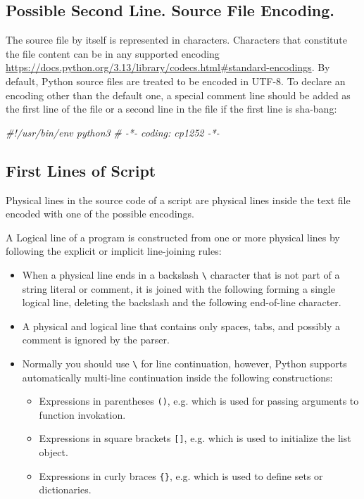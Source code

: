 \documentclass[
]{article}
\newenvironment{Shaded}{}{}
\newcommand{\CommentTok}[1]{\textcolor[rgb]{0.38,0.63,0.69}{\textit{#1}}}
\begin{document}
\hypertarget{possible-second-line-source-file-encoding}{%
\subsection{Possible Second Line. Source File
Encoding.}\label{possible-second-line-source-file-encoding}}

The source file by itself is represented in characters. Characters that
constitute the file content can be in any supported encoding
\url{https://docs.python.org/3.13/library/codecs.html\#standard-encodings}.
By default, Python source files are treated to be encoded in UTF-8. To
declare an encoding other than the default one, a special comment line
should be added as the first line of the file or a second line in the
file if the first line is sha-bang:

\begin{Shaded}
\begin{Highlighting}[]
\CommentTok{\#!/usr/bin/env python3}
\CommentTok{\# {-}*{-} coding: cp1252 {-}*{-}}
\end{Highlighting}
\end{Shaded}

\hypertarget{first-lines-of-script}{%
\subsection{First Lines of Script}\label{first-lines-of-script}}

Physical lines in the source code of a script are physical lines inside
the text file encoded with one of the possible encodings.

A Logical line of a program is constructed from one or more physical
lines by following the explicit or implicit line-joining rules:

\begin{itemize}
\item
  When a physical line ends in a backslash \texttt{\textbackslash{}}
  character that is not part of a string literal or comment, it is
  joined with the following forming a single logical line, deleting the
  backslash and the following end-of-line character.
\item
  A physical and logical line that contains only spaces, tabs, and
  possibly a comment is ignored by the parser.
\item
  Normally you should use \texttt{\textbackslash{}} for line
  continuation, however, Python supports automatically multi-line
  continuation inside the following constructions:

  \begin{itemize}
  \item
    Expressions in parentheses \texttt{()}, e.g. which is used for
    passing arguments to function invokation.
  \item
    Expressions in square brackets \texttt{{[}{]}}, e.g. which is used
    to initialize the list object.
  \item
    Expressions in curly braces \texttt{\{\}}, e.g. which is used to
    define sets or dictionaries.
  \end{itemize}
\end{itemize}
\end{document}
